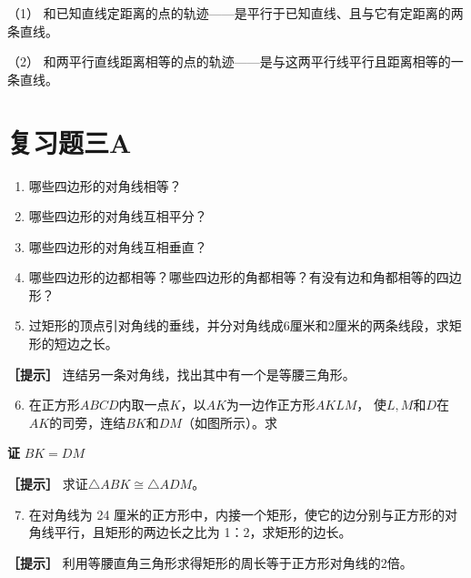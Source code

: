 （1）
和已知直线定距离的点的轨迹------是平行于已知直线、且与它有定距离的两条直线。

（2）
和两平行直线距离相等的点的轨迹------是与这两平行线平行且距离相等的一条直线。

\section{复习题三A}

\begin{enumerate}
\item
  哪些四边形的对角线相等？
\item
  哪些四边形的对角线互相平分？
\item
  哪些四边形的对角线互相垂直？
\item
  哪些四边形的边都相等？哪些四边形的角都相等？有没有边和角都相等的四边形？
\item
  过矩形的顶点引对角线的垂线，并分对角线成6厘米和2厘米的两条线段，求矩形的短边之长。
\end{enumerate}

\textbf{［提示］} 连结另一条对角线，找出其中有一个是等腰三角形。

\begin{enumerate}
\setcounter{enumi}{5}
\item
  在正方形\(ABCD\)内取一点\(K\)，以\(AK\)为一边作正方形\(AKLM\)，
  使\(L, M\)和\(D\)在\(AK\)的司旁，连结\(BK\)和\(DM\)（如图所示）。求
\end{enumerate}

\textbf{证} \(BK = DM\)

\textbf{［提示］} 求证\(\triangle ABK \cong \triangle ADM\)。

\begin{enumerate}
\setcounter{enumi}{6}
\item
  在对角线为 24
  厘米的正方形中，内接一个矩形，使它的边分别与正方形的对角线平行，且矩形的两边长之比为
  1：2，求矩形的边长。
\end{enumerate}

\textbf{［提示］}
利用等腰直角三角形求得矩形的周长等于正方形对角线的2倍。

